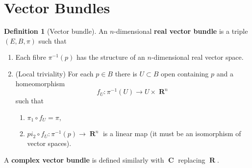 \documentclass[10pt,]{book}
\newcommand{\terminology}[1]{\textbf{#1}}
\theoremstyle{plain}
\theoremstyle{definition}
\newtheorem{definition}[theorem]{Definition}
\numberwithin{equation}{section}
\DeclareMathOperator{\CC}{\mathbf{C}}
\DeclareMathOperator{\RR}{\mathbf{R}}
\begin{document}
\section[Vector Bundles]{Vector Bundles}\label{sec-vector-bundles}
\begin{definition}[Vector bundle]\label{definition-28}
An \(n\)-dimensional \terminology{real vector bundle} is a triple \((E,B,\pi)\) such that
            \begin{enumerate}
\item{}Each fibre \(\pi^{-1}(p)\) has the structure of an \(n\)-dimensional real vector space.\item{}(Local triviality) For each \(p \in B\) there is \(U \subset B\) open containing \(p\) and a homeomorphism
                \[f_U\colon \pi^{-1}(U) \to U \times \RR^n\]
                such that
                \begin{enumerate}
\item{}\(\pi_1\circ f_U = \pi\),\item{}\(pi_2 \circ f_U\colon \pi^{-1}(p) \to \RR^n\) is a linear map (it must be an isomorphism of vector spaces).\end{enumerate}

              \end{enumerate}

            A \terminology{complex vector bundle} is defined similarly with \(\CC\) replacing \(\RR\).
          \end{definition}
\typeout{************************************************}
\typeout{************************************************}
\end{document}
